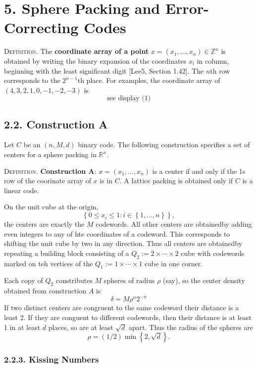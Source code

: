 \documentclass{article}
\newcommand{\Z}{\mathbb{Z}}
\newcommand{\R}{\mathbb{R}}
\renewcommand{\=}{\equiv}
\newcommand{\set}[1]{\left\{ #1 \right\}}
\newcommand{\header}[1]{\vspace{1em}\noindent\textsc{#1.} }
\begin{document}
\section*{5. Sphere Packing and Error-Correcting Codes}

\header{Definition}
The \textbf{coordinate array of a point} $x = (x_1, \dots, x_n) \in \Z^n$ is obtained by writing the binary expansion of the coordinates $x_i$ in column, beginning with the least significant digit [Lee5, Section 1.42].
The $n$th row corresponds to the $2^{n-1}$th place.
For examples, the coordinate array of $(4,3,2,1,0,-1,-2,-3)$ is
$$
\text{see display (1)}
$$

\subsection*{2.2. Construction A}

Let $C$ be an $(n,M,d)$ binary code.
The following construction specifies a set of centers for a sphere packing in $\R^n$.

\header{Definition}
\textbf{Construction A}: $x = (x_1, \dots, x_n)$ is a center if and only if the 1s row of the coorinate array of $x$ is in $C$.
A lattice packing is obtained only if $C$ is a linear code.

On the unit cube at the origin,
$$ \set{ 0 \leq x_i \leq 1 : i \in \set{1,\dots,n} }, $$
the centers are exactly the $M$ codewords.
All other centers are obtainedby adding even integers to any of hte coordinates of a codeword.
This corresponds to shifting the unit cube by two in any direction.
Thus all centers are obtainedby repeating a building block consisting of a $Q_2 := 2 \times \cdots \times 2$ cube with codewords marked on teh vertices of the $Q_1 := 1 \times \cdots \times 1$ cube in one corner.

Each copy of $Q_2$ constributes $M$ spheres of radius $\rho$ (say), so the center density obtained from construction $A$ is
$$ \delta = M \rho^n 2^{-n} $$
If two distinct centers are congruent to the same codeword their distance is a least 2.
If they are conguent to different codewords, then their distance is at least 1 in at least $d$ places, so are at least $\sqrt d$ apart.
Thus the radius of the spheres are
$$ \rho = (1/2) \min \set{ 2, \sqrt d }. $$

\subsubsection*{2.2.3. Kissing Numbers}
\end{document}
